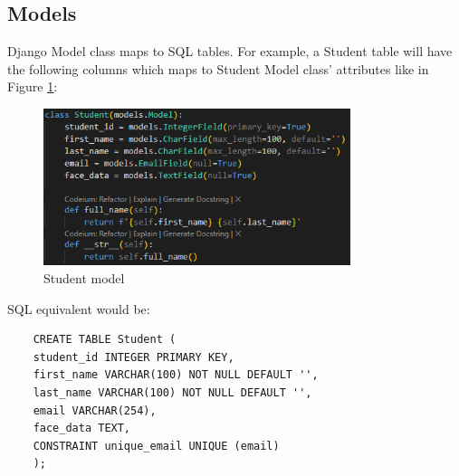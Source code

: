 \subsection{Models}
Django Model class maps to SQL tables. For example, a Student table will have the following columns which maps to Student Model class' attributes like in Figure \ref{fig:models}: 

\begin{figure}[h] %
	\centering
	\includegraphics[width=0.8\textwidth]{figures/chapter4/models.png} %
	\caption{Student model}
	\label{fig:models}
\end{figure}

SQL equivalent would be:
\begin{verbatim}
	CREATE TABLE Student (
	student_id INTEGER PRIMARY KEY,
	first_name VARCHAR(100) NOT NULL DEFAULT '',
	last_name VARCHAR(100) NOT NULL DEFAULT '',
	email VARCHAR(254),
	face_data TEXT,
	CONSTRAINT unique_email UNIQUE (email)
	);
\end{verbatim}
